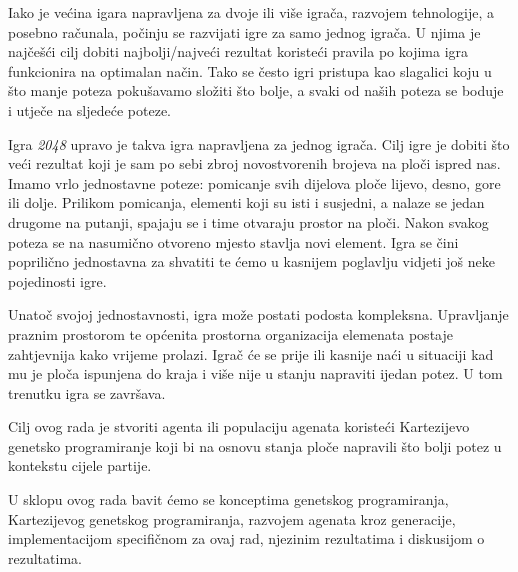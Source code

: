 Iako je većina igara napravljena za dvoje ili više igrača, razvojem tehnologije, a posebno računala, počinju se razvijati igre za samo jednog igrača. U njima je najčešći cilj dobiti najbolji/najveći rezultat koristeći pravila po kojima igra funkcionira na optimalan način. Tako se često igri pristupa kao slagalici koju u što manje poteza pokušavamo složiti što bolje, a svaki od naših poteza se boduje i utječe na sljedeće poteze.\par
Igra \textit{2048} upravo je takva igra napravljena za jednog igrača. Cilj igre je dobiti što veći rezultat koji je sam po sebi zbroj novostvorenih brojeva na ploči ispred nas. Imamo vrlo jednostavne poteze: pomicanje svih dijelova ploče lijevo, desno, gore ili dolje. Prilikom pomicanja, elementi koji su isti i susjedni, a nalaze se jedan drugome na putanji, spajaju se i time otvaraju prostor na ploči. Nakon svakog poteza se na nasumično otvoreno mjesto stavlja novi element. Igra se čini poprilično jednostavna za shvatiti te ćemo u kasnijem poglavlju vidjeti još neke pojedinosti igre.\par
Unatoč svojoj jednostavnosti, igra može postati podosta kompleksna. Upravljanje praznim prostorom te općenita prostorna organizacija elemenata postaje zahtjevnija kako vrijeme prolazi. Igrač će se prije ili kasnije naći u situaciji kad mu je ploča ispunjena do kraja i više nije u stanju napraviti ijedan potez. U tom trenutku igra se završava.\par 
Cilj ovog rada je stvoriti agenta ili populaciju agenata koristeći Kartezijevo genetsko programiranje koji bi na osnovu stanja ploče napravili što bolji potez u kontekstu cijele partije.\par
U sklopu ovog rada bavit ćemo se konceptima genetskog programiranja, Kartezijevog genetskog programiranja, razvojem agenata kroz generacije, implementacijom specifičnom za ovaj rad, njezinim rezultatima i diskusijom o rezultatima.
